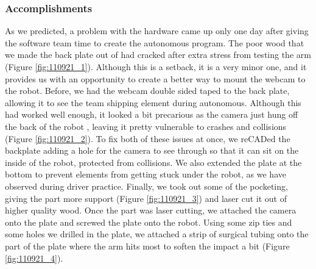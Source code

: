 \subsubsection*{Accomplishments}

As we predicted, a problem with the hardware came up only one day after giving the software team time to create the autonomous program. The poor wood that we made the back plate out of had cracked after extra stress from testing the arm (Figure \ref{fig:110921_1}). Although this is a setback, it is a very minor one, and it provides us with an opportunity to create a better way to mount the webcam to the robot. Before, we had the webcam double sided taped to the back plate, allowing it to see the team shipping element during autonomous. Although this had worked well enough, it looked a bit precarious as the camera just hung off the back of the robot , leaving it pretty vulnerable to crashes and collisions (Figure \ref{fig:110921_2}). To fix both of these issues at once, we reCADed the backplate adding a hole for the camera to see through so that it can sit on the inside of the robot, protected from collisions. We also extended the plate at the bottom to prevent elements from getting stuck under the robot, as we have observed during driver practice. Finally, we took out some of the pocketing, giving the part more support (Figure \ref{fig:110921_3}) and laser cut it out of higher quality wood.
Once the part was laser cutting, we attached the camera onto the plate and screwed the plate onto the robot. Using some zip ties and some holes we drilled in the plate, we attached a strip of surgical tubing onto the part of the plate where the arm hits most to soften the impact a bit (Figure \ref{fig:110921_4}).

